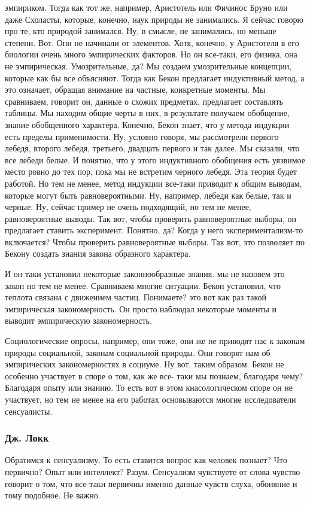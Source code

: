 эмпириком. Тогда как тот же, например, Аристотель или Фичинос Бруно или даже
Схоласты, которые, конечно, наук природы не занимались. Я сейчас говорю про те,
кто природой занимался. Ну, в смысле, не занимались, но меньше степени. Вот. Они
не начинали от элементов. Хотя, конечно, у Аристотеля в его биологии очень много
эмпирических факторов. Но он все-таки, его физика, она не эмпирическая.
Умозрительные, да? Мы создаем умозрительные концепции, которые как бы все
объясняют. Тогда как Бекон предлагает индуктивный метод, а это означает, обращая
внимание на частные, конкретные моменты. Мы сравниваем, говорит он, данные о
схожих предметах, предлагает составлять таблицы. Мы находим общие черты в них, в
результате получаем обобщение, знание обобщенного характера. Конечно, Бекон
знает, что у метода индукции есть пределы применимости. Ну, условно говоря, мы
рассмотрели первого лебедя, второго лебедя, третьего, двадцать первого и так
далее. Мы сказали, что все лебеди белые. И понятно, что у этого индуктивного
обобщения есть уязвимое место ровно до тех пор, пока мы не встретим черного
лебедя. Эта теория будет работой. Но тем не менее, метод индукции все-таки
приводит к общим выводам, которые могут быть равновероятными. Ну, например,
лебеди как белые, так и черные. Ну, сейчас пример не очень подходящий, но тем не
менее, равновероятные выводы. Так вот, чтобы проверить равновероятные выборы, он
предлагает ставить эксперимент. Понятно, да? Когда у него экспериментализм-то
включается? Чтобы проверить равновероятные выборы. Так вот, это позволяет по
Бекону создать знания закона образного характера. 

И он таки установил некоторые
законнообразные знания. мы не назовем это закон но тем не менее. Сравниваем
многие ситуации. Бекон установил, что теплота связана с движением частиц.
Понимаете? это вот как раз такой эмпирическая закономерность. Он просто наблюдал
некоторые моменты и выводит эмпирическую закономерность. 

Социологические опросы,
например, они тоже, они же не приводят нас к законам природы социальной, законам
социальной природы. Они говорят нам об эмпирических закономерностях в социуме.
Ну вот, таким образом. Бекон не особенно участвует в споре о том, как же все-
таки мы познаем, благодаря чему? Благодаря опыту или знанию. То есть вот в этом
кнасологическом споре он не участвует, но тем не менее на его работах
основываются многие исследователи сенсуалисты. 

\subsubsection{Дж. Локк}
Обратимся к сенсуализму. То есть ставится вопрос как человек познает? Что
первично? Опыт или интеллект? Разум. Сенсуализм чувствуете от слова чувство
говорит о том, что все-таки первичны именно данные чувств слуха, обоняние и тому
подобное. Не важно. 

